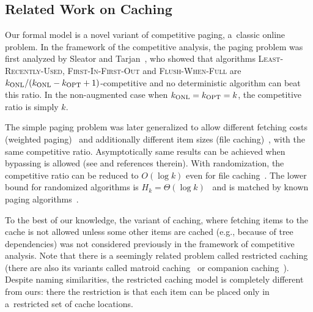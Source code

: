 \documentclass[sigconf,screen=true]{acmart}
\newcommand{\kALG}{k_\textnormal{ONL}}
\newcommand{\kOPT}{k_\textnormal{OPT}}
\begin{document}

\subsection{Related Work on Caching}

Our formal model is a novel variant of competitive paging, a~classic online
problem. In the framework of the competitive analysis, the paging problem was
first analyzed  by Sleator and Tarjan~\cite{competitive-analysis}, who showed
that algorithms \textsc{Least-Recently-Used}, \textsc{First-In-First-Out} and
\textsc{Flush-When-Full} are $\kALG / (\kALG - \kOPT + 1)$-competitive 
and no deterministic algorithm can beat this ratio. In the non-augmented case
when $\kALG = \kOPT = k$, the competitive ratio is simply $k$.

The simple paging problem was later generalized to allow different fetching
costs (weighted paging)~\cite{double-coverage,young-paging-greedy-dual} and
additionally different item sizes (file caching)~\cite{young-paging-landlord},
with the same competitive ratio. Asymptotically same results can be achieved
when bypassing is allowed (see \cite{caching-rejection-penalties,paging-irani}
and references therein). With randomization, the competitive ratio can be
reduced to $O(\log k)$ even for file caching~\cite{generalized-caching-optimal}. 
The lower bound for randomized algorithms is $H_k = 
\Theta(\log k)$~\cite{paging-mark} and is matched by known paging
algorithms~\cite{paging-optimal-easy,paging-optimal-difficult}.

To the best of our knowledge, the variant of caching, where fetching items to
the cache is not allowed unless some other items are cached (e.g., because of 
tree dependencies) was 
not considered previously in the framework of competitive analysis. Note that
there is a seemingly related problem called restricted
caching~\cite{restricted-caching} (there are also its variants called matroid
caching~\cite{matroid-caching} or companion caching~\cite{companion-caching}).
Despite naming similarities, the restricted caching model is completely
different from ours: there the restriction is that each item can be placed only in
a~restricted set of cache locations.



\end{document}
